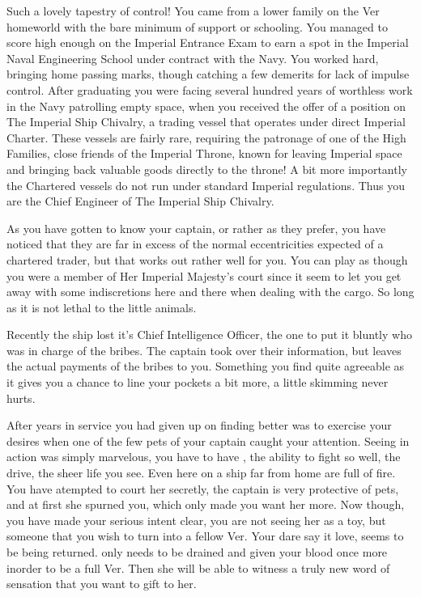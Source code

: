 \documentclass[char]{guildcamp4}
\begin{document}
\name{\cVtwo{}}


Such a lovely tapestry of control! 
You came from a lower family on the Ver homeworld with the bare minimum of support or schooling. You managed to score high enough
on the Imperial Entrance Exam to earn a spot in the Imperial Naval Engineering School under contract with the Navy. You worked
hard, bringing home passing marks, though catching a few demerits for lack of impulse control. After graduating you were facing 
several hundred years of worthless work in the Navy patrolling empty space, when you received the offer of a position on 
The Imperial Ship Chivalry, a trading vessel that operates under direct Imperial Charter. These vessels are fairly rare, requiring
the patronage of one of the High Families, close friends of the Imperial Throne, known for leaving Imperial space and bringing
back valuable goods directly to the throne! A bit more importantly the Chartered vessels do not run under standard Imperial regulations.
Thus you are the Chief Engineer of The Imperial Ship Chivalry. 

As you have gotten to know your captain, or rather \cVone{\Duke} as they prefer, you have noticed that they are far in excess of the normal eccentricities expected of a chartered trader, but that works out rather well for you. You can play as though you were a member of Her Imperial Majesty's court since it seem to let you get away with some indiscretions here and there when dealing with the cargo. So long as it is not lethal to the little animals. 

Recently the ship lost it's Chief Intelligence Officer, the one to put it bluntly who was in charge of the bribes. The captain took over their information, but leaves the actual payments of the bribes to you. Something you find quite agreeable as it gives you a chance to line your pockets a bit more, a little skimming never hurts.

After years in \cVone{\their} service you had given up on finding better was to exercise your desires when one of the few pets of your captain caught your attention. Seeing  \cJulie{} in action was simply marvelous, you have to have \cJulie{\them}, the ability to fight so well, the drive, the sheer life you see. Even here on a ship far from home \cJulie{\they} are full of fire. You have atempted to court her secretly, the captain is very protective of  pets, and at first she spurned you, which only made you want her more. Now though, you have made your serious intent clear, you are not seeing her as a toy, but someone that you wish to turn into a fellow Ver. Your dare say it love, seems to be being returned. \cJulie{} only needs to be drained and given your blood once more inorder to be a full Ver. Then she will be able to witness a truly new word of sensation that you want to gift to her.
\end{document}
